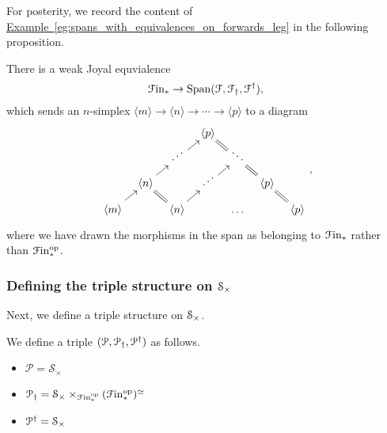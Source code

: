 \documentclass[main.tex]{subfiles}
\begin{document}
For posterity, we record the content of \hyperref[eg:spans_with_equivalences_on_forwards_leg]{Example~\ref*{eg:spans_with_equivalences_on_forwards_leg}} in the following proposition.

\begin{lemma}
  There is a weak Joyal equvialence
  \begin{equation*}
    \Finp \to \Span\triple{F},
  \end{equation*}
  which sends an $n$-simplex $\langle m \rangle \to \langle n \rangle \to \cdots \to \langle p \rangle$ to a diagram
  \begin{equation*}
    \begin{tikzcd}[row sep=small, column sep=tiny]
      &&& \respace{\langle p \rangle}
      \\
      && \respace{\iddots}
      \arrow[ur]
      && \respace{\ddots}
      \arrow[ul, equals]
      \\
      & \respace{\langle n \rangle}
      \arrow[ur]
      && \respace{\iddots}
      \arrow[ur]
      && \respace{\langle p \rangle}
      \arrow[ul, equals]
      \\
      \langle m \rangle
      \arrow[ur]
      && \respace{\langle n \rangle}
      \arrow[ul, equals]
      \arrow[ur]
      && \respace{\dots}
      && \respace{\langle p \rangle}
      \arrow[ul, equals]
    \end{tikzcd},
  \end{equation*}
  where we have drawn the morphisms in the span as belonging to $\Finp$ rather than $\Finp\op$.
\end{lemma}

\subsubsection{Defining the triple structure on \texorpdfstring{$\S_{\times}$}{S}}

Next, we define a triple structure on $\S_{\times}$.

\begin{definition}
  We define a triple $\triple{P}$ as follows.
  \begin{itemize}
    \item $\mathcal{P} = \mathcal{S}_{\times}$

    \item $\mathcal{P}\downdag = \mathcal{S}_{\times} \times_{\Finp\op} (\Finp\op)^{\simeq}$

    \item $\mathcal{P}\updag = \mathcal{S}_{\times}$
  \end{itemize}
\end{definition}
\end{document}

